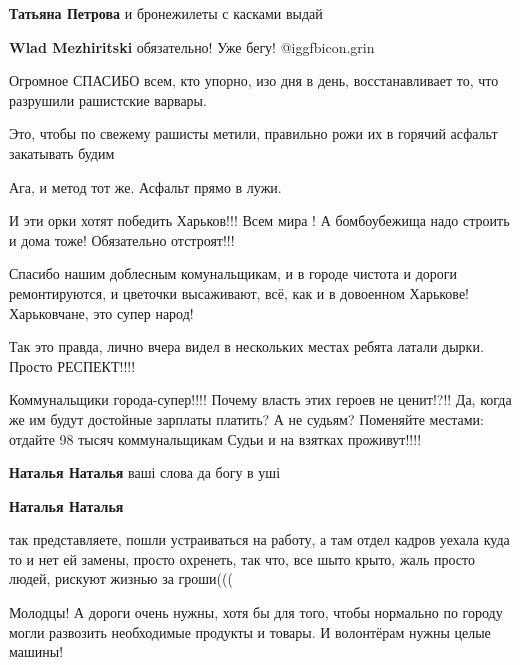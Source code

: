\begin{itemize}
\begin{itemize}
\textbf{Татьяна Петрова} и бронежилеты с касками выдай

\textbf{Wlad Mezhiritski} обязательно! Уже бегу! @igg{fbicon.grin} 

\end{itemize} %


Огромное СПАСИБО всем, кто упорно, изо дня в день, восстанавливает то, что
разрушили рашистские варвары.


Это, чтобы по свежему рашисты метили, правильно рожи их в горячий асфальт
закатывать будим

Ага, и метод тот же. Асфальт прямо в лужи.


И эти орки хотят победить Харьков!!! Всем мира ! А бомбоубежища надо строить и
дома тоже! Обязательно отстроят!!!


Спасибо нашим доблесным комунальщикам, и в городе чистота и дороги
ремонтируются, и цветочки высаживают, всё, как и в довоенном
Харькове! Харьковчане, это супер народ!


Так это правда, лично вчера видел в нескольких местах ребята латали дырки.
Просто РЕСПЕКТ!!!!


\obeycr
Коммунальщики города-супер!!!!
Почему власть этих героев не ценит!?!!
Да, когда же им будут достойные зарплаты платить?
А не судьям?
Поменяйте местами: отдайте 98 тысяч коммунальщикам
Судьи и на взятках проживут!!!!
\restorecr

\begin{itemize} %
\textbf{Наталья Наталья} ваші слова да богу в уші

\textbf{Наталья Наталья} 

так представляете, пошли устраиваться на работу, а там отдел кадров уехала куда
то и нет ей замены, просто охренеть, так что, все шыто крыто, жаль просто
людей, рискуют жизнью за гроши(((

\end{itemize} %


Молодцы! А дороги очень нужны, хотя бы для того, чтобы нормально по городу
могли развозить необходимые продукты и товары. И волонтёрам нужны целые машины!


\end{itemize}
